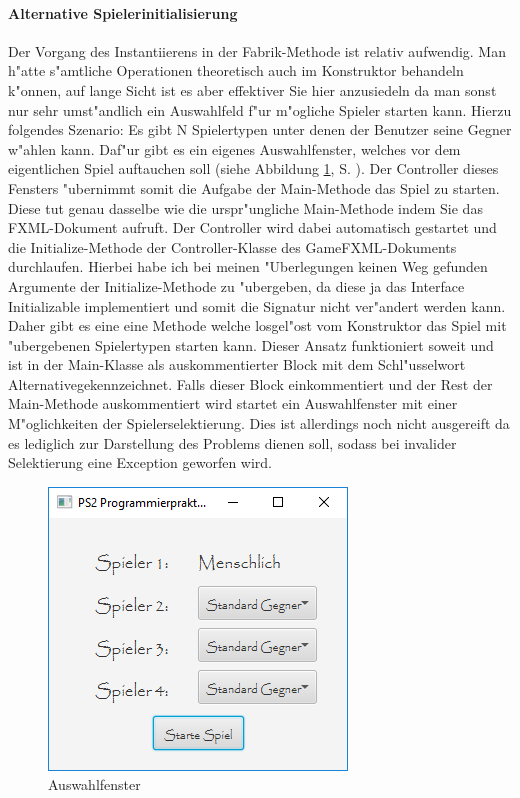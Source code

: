 \paragraph{Alternative Spielerinitialisierung}
\label{par:alternativeSpielerinitialisierung}
Der Vorgang des Instantiierens in der Fabrik-Methode ist relativ aufwendig. Man h"atte s"amtliche Operationen theoretisch auch im Konstruktor behandeln k"onnen, auf lange Sicht ist es aber effektiver Sie hier anzusiedeln da man sonst nur sehr umst"andlich ein Auswahlfeld f"ur m"ogliche Spieler starten kann. Hierzu folgendes Szenario: Es gibt N Spielertypen unter denen der Benutzer seine Gegner w"ahlen kann. Daf"ur gibt es ein eigenes Auswahlfenster, welches vor dem eigentlichen Spiel auftauchen soll (siehe Abbildung \ref{fig:auswahlfenster}, S. \pageref{fig:auswahlfenster}). Der Controller dieses Fensters "ubernimmt somit die Aufgabe der Main-Methode das Spiel zu starten. Diese tut genau dasselbe wie die urspr"ungliche Main-Methode indem Sie das FXML-Dokument aufruft. Der Controller wird dabei automatisch gestartet und die Initialize-Methode der Controller-Klasse des GameFXML-Dokuments durchlaufen. Hierbei habe ich bei meinen "Uberlegungen keinen Weg gefunden Argumente der Initialize-Methode zu "ubergeben, da diese ja das Interface Initializable implementiert und somit die Signatur nicht ver"andert werden kann. Daher gibt es eine eine Methode welche losgel"ost vom Konstruktor das Spiel mit "ubergebenen Spielertypen starten kann. Dieser Ansatz funktioniert soweit und ist in der Main-Klasse als auskommentierter Block mit dem Schl"usselwort \glqq Alternative\grqq  gekennzeichnet. Falls dieser Block einkommentiert und der Rest der Main-Methode auskommentiert wird startet ein Auswahlfenster mit einer M"oglichkeiten der Spielerselektierung. Dies ist allerdings noch nicht ausgereift da es lediglich zur Darstellung des Problems dienen soll, sodass bei invalider Selektierung eine Exception geworfen wird.

\begin{figure}
	\centering
	\includegraphics[width=.4\linewidth]{pics/Intro240918}
	\caption[Auswahlfenster]{Auswahlfenster}
	\label{fig:auswahlfenster}
\end{figure}

